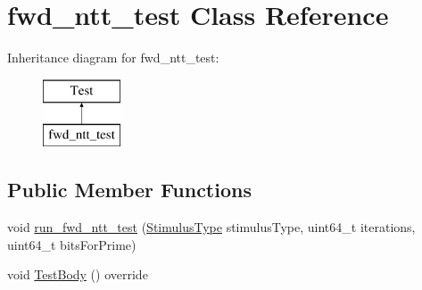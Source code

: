 \hypertarget{classfwd__ntt__test}{\section{fwd\-\_\-ntt\-\_\-test Class Reference}
\label{classfwd__ntt__test}
}
Inheritance diagram for fwd\-\_\-ntt\-\_\-test\-:\begin{figure}[H]
\begin{center}
\leavevmode
\includegraphics[height=2.000000cm]{classfwd__ntt__test}
\end{center}
\end{figure}
\subsection*{Public Member Functions}
\begin{DoxyCompactItemize}
\item 
void \hyperlink{classfwd__ntt__test_afd48a701b23f9e9efd2e64aaded2cd32}{run\-\_\-fwd\-\_\-ntt\-\_\-test} (\hyperlink{namespacehetest_1_1utils_a17ac57eb86d3ead191cb51163ef63eb0}{Stimulus\-Type} stimulus\-Type, uint64\-\_\-t iterations, uint64\-\_\-t bits\-For\-Prime)
\item 
void \hyperlink{classfwd__ntt__test_a9edfd258d90a49382602613427a49111}{Test\-Body} () override
\end{DoxyCompactItemize}


